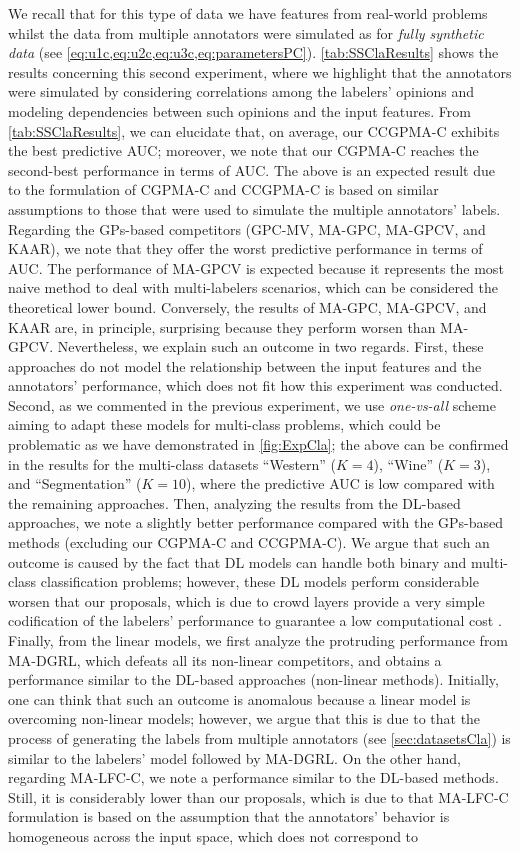 \documentclass[journal]{IEEEtran}
\begin{document}
We recall that for this type of data we have features from real-world problems whilst the data from multiple annotators were simulated as for \textit{fully synthetic data} (see \cref{eq:u1c,eq:u2c,eq:u3c,eq:parametersPC}). \cref{tab:SSClaResults} shows the results concerning this second experiment, where we highlight that the annotators were simulated by considering correlations among the labelers' opinions and modeling dependencies between such opinions and the input features. From \cref{tab:SSClaResults}, we can elucidate that, on average, our CCGPMA-C exhibits the best predictive AUC; moreover, we note that our CGPMA-C reaches the second-best performance in terms of AUC. The above is an expected result due to the formulation of CGPMA-C and CCGPMA-C is based on similar assumptions to those that were used to simulate the multiple annotators' labels. Regarding the GPs-based competitors (GPC-MV, MA-GPC, MA-GPCV, and KAAR), we note that they offer the worst predictive performance in terms of AUC. The performance of MA-GPCV is expected because it represents the most naive method to deal with multi-labelers scenarios, which can be considered the theoretical lower bound. Conversely, the results of MA-GPC, MA-GPCV, and KAAR are, in principle, surprising because they perform worsen than MA-GPCV. Nevertheless, we explain such an outcome in two regards. First, these approaches do not model the relationship between the input features and the annotators' performance, which does not fit how this experiment was conducted. Second, as we commented in the previous experiment, we use \textit{one-vs-all} scheme aiming to adapt these models for multi-class problems, which could be problematic as we have demonstrated in \cref{fig:ExpCla}; the above can be confirmed in the results for the multi-class datasets ``Western'' ($K=4$), ``Wine'' ($K=3$), and ``Segmentation'' ($K=10$), where the predictive AUC is low compared with the remaining approaches. Then, analyzing the results from the DL-based approaches, we note a slightly better performance compared with the GPs-based methods (excluding our CGPMA-C and CCGPMA-C). We argue that such an outcome is caused by the fact that DL models can handle both binary and multi-class classification problems; however, these DL models perform considerable worsen that our proposals, which is due to crowd layers provide a very simple codification of the labelers' performance to guarantee a low computational cost \cite{morales2019scalable1}. Finally, from the linear models, we first analyze the protruding performance from MA-DGRL, which defeats all its non-linear competitors, and obtains a  performance similar to the DL-based approaches (non-linear methods). Initially, one can think that such an outcome is anomalous because a linear model is overcoming non-linear models; however, we argue that this is due to that the process of generating the labels from multiple annotators (see \cref{sec:datasetsCla}) is similar to the labelers' model followed by MA-DGRL. On the other hand, regarding MA-LFC-C, we note a performance similar to the DL-based methods. Still, it is considerably lower than our proposals, which is due to that MA-LFC-C formulation is based on the assumption that the annotators' behavior is homogeneous across the input space, which does not correspond to 
\end{document}
